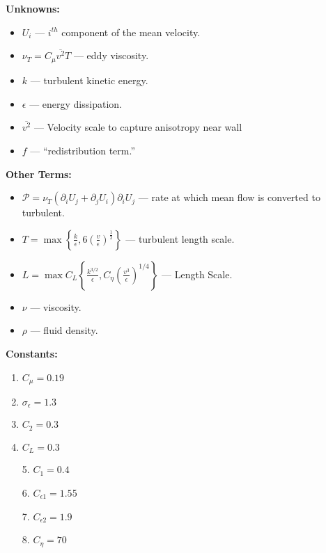 \documentclass[12pt]{article}
\newcommand{\ep}{\epsilon} \newcommand{\noi}{\noindent}
\newcommand{\pr}{\partial}
\begin{document}
\noi \textbf{Unknowns:}
\begin{itemize}
	\item $U_i$ --- $i^{th}$ component of the mean velocity. 
	\item $\nu_T = C_\mu \overline{v^2} T$ \newline
		 --- eddy viscosity. 
	\item $k$ --- turbulent kinetic energy. 
	\item $\ep$ --- energy dissipation.
	\item $\overline{v^2}$ --- Velocity scale to capture anisotropy near wall
	\item $f$ --- ``redistribution term.''
\end{itemize}

\noi \textbf{Other Terms:} 
\begin{itemize}
	\item $\mathcal{P} = \nu_T( \pr_i U_j + \pr_j U_i)\pr_i U_j$ \newline
		--- rate at which mean flow is converted to turbulent.
	\item $T = \max \left\{ \frac{k}{\ep} , 6 \left( \frac{v}{\ep}
		\right)^{\frac{1}{2}} \right\}$ \newline
		--- turbulent length scale. 
	\item $L = \max C_L\left\{ \frac{k^{3/2}}{\ep}, C_\eta ( \frac{v^3}{\ep} )^{1/4} \right\}$ \newline
		--- Length Scale.
	\item $\nu$ --- viscosity. 
	\item $\rho$ --- fluid density. 
\end{itemize}

\noi \textbf{Constants:}
\begin{multicols}{2}
\begin{enumerate}
	\item $C_\mu = 0.19$
	\item $\sigma_\ep = 1.3$
	\item $C_2 = 0.3$	
	\item $C_L = 0.3$
\end{enumerate}
\columnbreak 

\begin{itemize}
	\item[5.] $C_1 = 0.4$
	\item[6.] $C_{\ep 1} = 1.5$5%
	\item[7.] $C_{\ep 2} = 1.9$  
	\item[8.] $C_\eta = 70$
\end{itemize}
\end{multicols}
\end{document}
